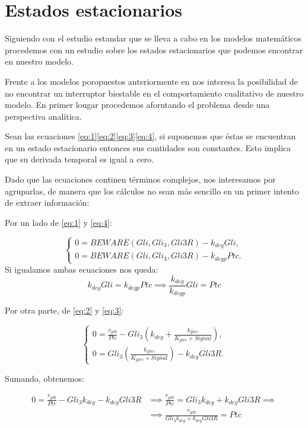 \section{Estados estacionarios}
Siguiendo con el estudio estandar que se lleva a cabo en los modelos matemáticos procedemos con un estudio sobre los estados estacionarios que podemos encontrar en nuestro modelo.

Frente a los modelos poropuestos anteriormente en \cite{saha,schaffer} nos interesa la posibilidad de no encontrar un interruptor biestable en el comportamiento cualitativo de nuestro modelo. En primer lougar procedemos aforntando el problema desde una perspectiva analítica. 

Sean las ecuaciones \ref{eq:1}\ref{eq:2}\ref{eq:3}\ref{eq:4}, si suponemos que éstas se encuentran en un estado estacionario entonces sus cantidades son constantes. Esto implica que su derivada temporal es igual a cero.

Dado que las ecuaciones continen términos complejos, nos interesamos por agruparlas, de manera que los cálculos no sean más sencillo en un primer intento de extraer información:

Por un lado de \ref{eq:1} y \ref{eq:4}:

$$\begin{cases} 0 = BEWARE(Gli, Gli_3, Gli3R)-k_{deg}Gli, \\0= BEWARE(Gli, Gli_3, Gli3R)-k_{degp}Ptc. \end{cases}$$
Si igualamos ambas ecuaciones nos queda:
\begin{equation}
 k_{deg}Gli=k_{degp}Ptc \implies \frac{k_{deg}}{k_{degp}}Gli=Ptc
\end{equation}

Por otra parte, de \ref{eq:2} y \ref{eq:3}:



$$\begin{cases} 0 = \frac{r_{g3b}}{Ptc}-Gli_3\left(k_{deg}+\frac{k_{g3rc}}{K_{g3rc}+Signal}\right), \\0=Gli_3\left(\frac{k_{g3rc}}{K_{g3rc}+Signal}\right)-k_{deg}Gli3R. \end{cases}$$

Sumando, obtenemos:

\begin{equation}
\begin{split}
0=\frac{r_{g3b}}{Ptc}-Gli_3k_{deg}-k_{deg}Gli3R & \implies \frac{r_{g3b}}{Ptc}=Gli_3k_{deg}+k_{deg}Gli3R\implies
 \\
& \implies \frac{r_{g3b}}{Gli_3k_{deg}+k_{deg}Gli3R}=Ptc
\end{split}
\end{equation}

